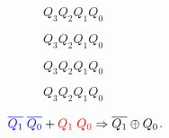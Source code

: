 \begin{figure}[H]
  \centering
  \caption{Mapa de Karnaugh para $Q_1\prime$ del contador descendente.}
  \begin{subfigure}{0.1\textwidth}
    \centering
  \end{subfigure}
  \begin{subfigure}{.4\textwidth}
    \centering
    \begin{Karnaugh}{$Q_3$}{$Q_2$}{$Q_1$}{$Q_0$}
    \end{Karnaugh}
  \end{subfigure}
  \begin{subfigure}{.4\textwidth}
    \centering
    \begin{Karnaugh}{$Q_3$}{$Q_2$}{$Q_1$}{$Q_0$}
    \end{Karnaugh}
  \end{subfigure}

  \begin{subfigure}{0.1\textwidth}
    \centering
  \end{subfigure}
  \begin{subfigure}{.4\textwidth}
    \centering
    \begin{Karnaugh}{$Q_3$}{$Q_2$}{$Q_1$}{$Q_0$}
    \end{Karnaugh}
  \end{subfigure}
  \begin{subfigure}{.4\textwidth}
    \centering
    \begin{Karnaugh}{$Q_3$}{$Q_2$}{$Q_1$}{$Q_0$}
    \end{Karnaugh}
  \end{subfigure}

  \begin{subfigure}{0.5\textwidth}
    \centering
  \end{subfigure}
  \begin{subfigure}{.4\textwidth}
    \centering
  \end{subfigure}
  \caption*{$
    \color{blue} \overline{Q_1} \phantom{\cdot} \overline{Q_0}
    \color{black} +
    \color{red} Q_1 \phantom{\cdot} Q_0
    \color{black} \Rightarrow \overline{Q_1} \oplus Q_0
  $.}
\end{figure}
